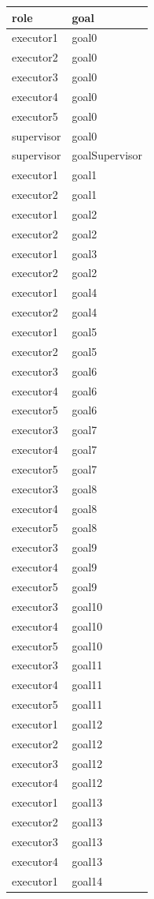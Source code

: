 \documentclass[12pt]{article}
\begin{document}
\begin{table}[H]
\centering
{}
\begin{tabular}{|l|l|}
\hline
\textbf{role} & \textbf{goal} \\ \hline
executor1 & goal0 \\ \hline
executor2 & goal0 \\ \hline
executor3 & goal0 \\ \hline
executor4 & goal0 \\ \hline
executor5 & goal0 \\ \hline
supervisor & goal0 \\ \hline
supervisor & goalSupervisor \\ \hline
executor1 & goal1 \\ \hline
executor2 & goal1 \\ \hline
executor1 & goal2 \\ \hline
executor2 & goal2 \\ \hline
executor1 & goal3 \\ \hline
executor2 & goal2 \\ \hline
executor1 & goal4 \\ \hline
executor2 & goal4 \\ \hline
executor1 & goal5 \\ \hline
executor2 & goal5 \\ \hline
executor3 & goal6 \\ \hline
executor4 & goal6 \\ \hline
executor5 & goal6 \\ \hline
executor3 & goal7 \\ \hline
executor4 & goal7 \\ \hline
executor5 & goal7 \\ \hline
executor3 & goal8 \\ \hline
executor4 & goal8 \\ \hline
executor5 & goal8 \\ \hline
executor3 & goal9 \\ \hline
executor4 & goal9 \\ \hline
executor5 & goal9 \\ \hline
executor3 & goal10 \\ \hline
executor4 & goal10 \\ \hline
executor5 & goal10 \\ \hline
executor3 & goal11 \\ \hline
executor4 & goal11 \\ \hline
executor5 & goal11 \\ \hline
executor1 & goal12 \\ \hline
executor2 & goal12 \\ \hline
executor3 & goal12 \\ \hline
executor4 & goal12 \\ \hline
executor1 & goal13 \\ \hline
executor2 & goal13 \\ \hline
executor3 & goal13 \\ \hline
executor4 & goal13 \\ \hline
executor1 & goal14 \\ \hline
\end{tabular}
\end{table}
\end{document}

